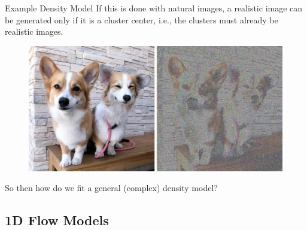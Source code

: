 \begin{frame}[allowframebreaks]
\begin{myconceptblock}{10.2}{Example Density Model}
    If this is done with natural images, a realistic image can be generated only if it is a cluster center, i.e., the clusters must already be realistic images.

    \begin{figure}[H]
        \centering
        \includegraphics[width=1.0\textwidth]{.././assets/10.2.png}
    \end{figure}

    So then how do we fit a general (complex) density model?
\end{myconceptblock}

\end{frame}

\subsection{1D Flow Models}

